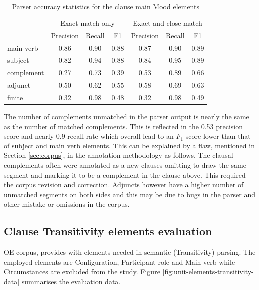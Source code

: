     \begin{table}[!ht]
    \centering
    \begin{tabular}{lcccccc}
    \toprule
     & \multicolumn{3}{c}{Exact match only} & \multicolumn{3}{c}{Exact and close match} \\ \cline{2-7} 
     & Precision & Recall & F1 & Precision & Recall & F1 \\ 
    \midrule
    main verb & 0.86 & 0.90 & 0.88 & 0.87 & 0.90 & 0.89 \\
    subject & 0.82 & 0.94 & 0.88 & 0.84 & 0.95 & 0.89 \\
    complement & 0.27 & 0.73 & 0.39 & 0.53 & 0.89 & 0.66 \\
    adjunct & 0.50 & 0.62 & 0.55 & 0.58 & 0.69 & 0.63 \\
    finite & 0.32 & 0.98 & 0.48 & 0.32 & 0.98 & 0.49 \\
    \bottomrule
    \end{tabular}
    \caption{Parser accuracy statistics for the clause main Mood elements}
    \label{tab:unit-elements-mood-combined-F1}
    \end{table}
    
    The number of complements unmatched in the parser output is nearly the same as the number of matched complements. This is reflected in the 0.53 precision score and nearly 0.9 recall rate which overall lead to an $F_1$ score lower than that of subject and main verb elements. This can be explained by a flaw, mentioned in Section \ref{sec:corpus}, in the annotation methodology as follows. The clausal complements often were annotated as a new clauses omitting to draw the same segment and marking it to be a complement in the clause above. This required the corpus revision and correction. Adjuncts however have a higher number of unmatched segments on both sides and this may be due to bugs in the parser and other mistake or omissions in the corpus.
    
\subsection{Clause Transitivity elements evaluation}
\label{sec:unit-transitivity-element-evaluation}

    OE corpus, provides with elements needed in semantic (Transitivity) parsing. The employed elements are Configuration, Participant role and Main verb while Circumstances are excluded from the study. Figure \ref{fig:unit-elements-transitivity-data} summarises the evaluation data. 
    
